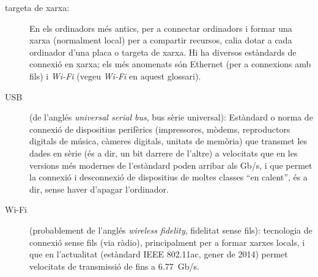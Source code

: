 \begin{description}
\item[targeta de xarxa:] En els ordinadors més antics, per a connectar
  ordinadors i formar una xarxa (normalment local) per a compartir
  recursos, calia dotar a cada ordinador d'una placa o targeta de
  xarxa. Hi ha diversos estàndards de connexió en xarxa; els més
  anomenats són Ethernet (per a connexions amb fils) i \emph{Wi-Fi}
  (vegeu \emph{Wi-Fi} en aquest glossari).

\item[USB] (de l'anglés \emph{universal serial bus}, bus sèrie
  universal): Estàndard o norma de connexió de dispositius perifèrics
  (impressores, mòdems, reproductors digitals de música, càmeres
  digitals, unitats de memòria) que transmet les dades en sèrie (és a
  dir, un bit darrere de l'altre) a velocitats que en les versions més
  modernes de l'estàndard poden arribar als Gb/s, i que permet la
  connexió i desconnexió de dispositius de moltes classes ``en
  calent'', és a dir, sense haver d'apagar l'ordinador.

\item[Wi-Fi] (probablement de l'anglés \emph{wireless fidelity},
  fidelitat sense fils): tecnologia de connexió sense fils (via
  ràdio), principalment per a formar xarxes locals, i que en
  l'actualitat (estàndard IEEE 802.11ac, gener de 2014) permet velocitats de
  transmissió de fins a 6.77~Gb/s.
\end{description}


